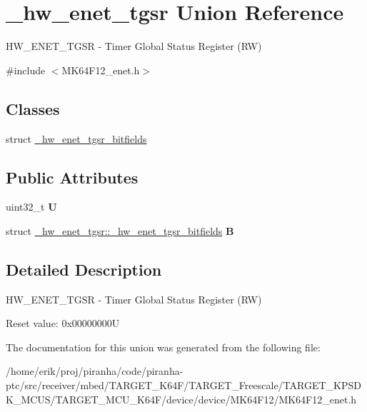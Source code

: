 \hypertarget{union__hw__enet__tgsr}{}\section{\+\_\+hw\+\_\+enet\+\_\+tgsr Union Reference}
\label{union__hw__enet__tgsr}


H\+W\+\_\+\+E\+N\+E\+T\+\_\+\+T\+G\+SR -\/ Timer Global Status Register (RW)  




{\ttfamily \#include $<$M\+K64\+F12\+\_\+enet.\+h$>$}

\subsection*{Classes}
\begin{DoxyCompactItemize}
\item 
struct \hyperlink{struct__hw__enet__tgsr_1_1__hw__enet__tgsr__bitfields}{\+\_\+hw\+\_\+enet\+\_\+tgsr\+\_\+bitfields}
\end{DoxyCompactItemize}
\subsection*{Public Attributes}
\begin{DoxyCompactItemize}
\item 
uint32\+\_\+t {\bfseries U}\hypertarget{union__hw__enet__tgsr_ad914e76a044cc4a24613793e3d991507}{}\label{union__hw__enet__tgsr_ad914e76a044cc4a24613793e3d991507}

\item 
struct \hyperlink{struct__hw__enet__tgsr_1_1__hw__enet__tgsr__bitfields}{\+\_\+hw\+\_\+enet\+\_\+tgsr\+::\+\_\+hw\+\_\+enet\+\_\+tgsr\+\_\+bitfields} {\bfseries B}\hypertarget{union__hw__enet__tgsr_ad959bbb5eef54ce996fef57317d9820e}{}\label{union__hw__enet__tgsr_ad959bbb5eef54ce996fef57317d9820e}

\end{DoxyCompactItemize}


\subsection{Detailed Description}
H\+W\+\_\+\+E\+N\+E\+T\+\_\+\+T\+G\+SR -\/ Timer Global Status Register (RW) 

Reset value\+: 0x00000000U 

The documentation for this union was generated from the following file\+:\begin{DoxyCompactItemize}
\item 
/home/erik/proj/piranha/code/piranha-\/ptc/src/receiver/mbed/\+T\+A\+R\+G\+E\+T\+\_\+\+K64\+F/\+T\+A\+R\+G\+E\+T\+\_\+\+Freescale/\+T\+A\+R\+G\+E\+T\+\_\+\+K\+P\+S\+D\+K\+\_\+\+M\+C\+U\+S/\+T\+A\+R\+G\+E\+T\+\_\+\+M\+C\+U\+\_\+\+K64\+F/device/device/\+M\+K64\+F12/M\+K64\+F12\+\_\+enet.\+h\end{DoxyCompactItemize}
